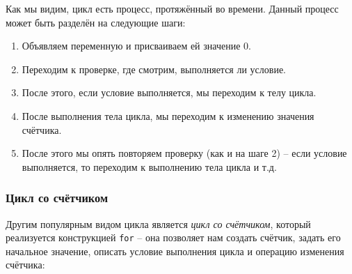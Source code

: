 \documentclass[../sparc.tex]{subfiles}
\begin{document}
\begin{figure}[ht]
  \centering
  \label{fig:control-flow-while-loop}
\end{figure}

Как мы видим, цикл есть процесс, протяжённый во времени. Данный процесс может
быть разделён на следующие шаги:

\begin{enumerate}
\item Объявляем переменную и присваиваем ей значение 0.
\item Переходим к проверке, где смотрим, выполняется ли условие.
\item После этого, если условие выполняется, мы переходим к телу цикла.
\item После выполнения тела цикла, мы переходим к изменению значения счётчика.
\item После этого мы опять повторяем проверку (как и на шаге 2) -- если условие
  выполняется, то переходим к выполнению тела цикла и т.д.
\end{enumerate}

\subsubsection{Цикл со счётчиком}

Другим популярным видом цикла является \emph{цикл со счётчиком}, который
реализуется конструкцией \texttt{for} -- она позволяет нам создать счётчик,
задать его начальное значение, описать условие выполнения цикла и операцию
изменения счётчика:
\end{document}
